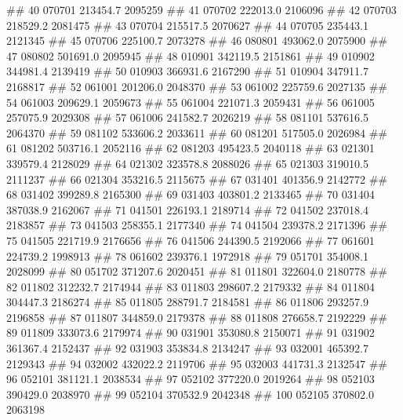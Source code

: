 \documentclass[11pt,]{article}
\newenvironment{Shaded}{\begin{snugshade}}{\end{snugshade}}
\newcommand{\NormalTok}[1]{#1}
\begin{document}
\begin{Shaded}
\begin{Highlighting}[]
{{{{\NormalTok{## 40  070701 213454.7 2095259}
\NormalTok{## 41  070702 222013.0 2106096}
\NormalTok{## 42  070703 218529.2 2081475}
\NormalTok{## 43  070704 215517.5 2070627}
\NormalTok{## 44  070705 235443.1 2121345}
\NormalTok{## 45  070706 225100.7 2073278}
\NormalTok{## 46  080801 493062.0 2075900}
\NormalTok{## 47  080802 501691.0 2095945}
\NormalTok{## 48  010901 342119.5 2151861}
\NormalTok{## 49  010902 344981.4 2139419}
\NormalTok{## 50  010903 366931.6 2167290}
\NormalTok{## 51  010904 347911.7 2168817}
\NormalTok{## 52  061001 201206.0 2048370}
\NormalTok{## 53  061002 225759.6 2027135}
\NormalTok{## 54  061003 209629.1 2059673}
\NormalTok{## 55  061004 221071.3 2059431}
\NormalTok{## 56  061005 257075.9 2029308}
\NormalTok{## 57  061006 241582.7 2026219}
\NormalTok{## 58  081101 537616.5 2064370}
\NormalTok{## 59  081102 533606.2 2033611}
\NormalTok{## 60  081201 517505.0 2026984}
\NormalTok{## 61  081202 503716.1 2052116}
\NormalTok{## 62  081203 495423.5 2040118}
\NormalTok{## 63  021301 339579.4 2128029}
\NormalTok{## 64  021302 323578.8 2088026}
\NormalTok{## 65  021303 319010.5 2111237}
\NormalTok{## 66  021304 353216.5 2115675}
\NormalTok{## 67  031401 401356.9 2142772}
\NormalTok{## 68  031402 399289.8 2165300}
\NormalTok{## 69  031403 403801.2 2133465}
\NormalTok{## 70  031404 387038.9 2162067}
\NormalTok{## 71  041501 226193.1 2189714}
\NormalTok{## 72  041502 237018.4 2183857}
\NormalTok{## 73  041503 258355.1 2177340}
\NormalTok{## 74  041504 239378.2 2171396}
\NormalTok{## 75  041505 221719.9 2176656}
\NormalTok{## 76  041506 244390.5 2192066}
\NormalTok{## 77  061601 224739.2 1998913}
\NormalTok{## 78  061602 239376.1 1972918}
\NormalTok{## 79  051701 354008.1 2028099}
\NormalTok{## 80  051702 371207.6 2020451}
\NormalTok{## 81  011801 322604.0 2180778}
\NormalTok{## 82  011802 312232.7 2174944}
\NormalTok{## 83  011803 298607.2 2179332}
\NormalTok{## 84  011804 304447.3 2186274}
\NormalTok{## 85  011805 288791.7 2184581}
\NormalTok{## 86  011806 293257.9 2196858}
\NormalTok{## 87  011807 344859.0 2179378}
\NormalTok{## 88  011808 276658.7 2192229}
\NormalTok{## 89  011809 333073.6 2179974}
\NormalTok{## 90  031901 353080.8 2150071}
\NormalTok{## 91  031902 361367.4 2152437}
\NormalTok{## 92  031903 353834.8 2134247}
\NormalTok{## 93  032001 465392.7 2129343}
\NormalTok{## 94  032002 432022.2 2119706}
\NormalTok{## 95  032003 441731.3 2132547}
\NormalTok{## 96  052101 381121.1 2038534}
\NormalTok{## 97  052102 377220.0 2019264}
\NormalTok{## 98  052103 390429.0 2038970}
\NormalTok{## 99  052104 370532.9 2042348}
\NormalTok{## 100 052105 370802.0 2063198}
}}}}
\end{Highlighting}
\end{Shaded}
\end{document}
